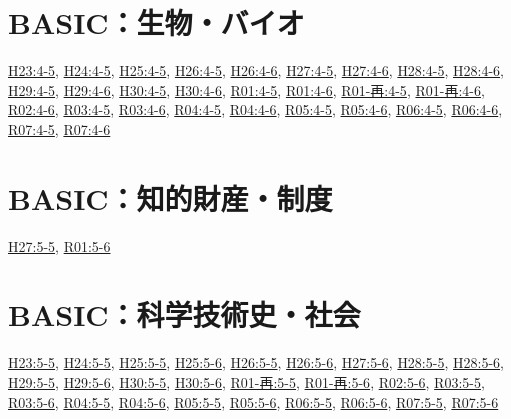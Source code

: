 \section{BASIC：生物・バイオ}
\hyperref[q:h23-reg-basic-4-5]{H23:4-5}, \hyperref[q:h24-reg-basic-4-5]{H24:4-5}, \hyperref[q:h25-reg-basic-4-5]{H25:4-5}, \hyperref[q:h26-reg-basic-4-5]{H26:4-5}, \hyperref[q:h26-reg-basic-4-6]{H26:4-6}, \hyperref[q:h27-reg-basic-4-5]{H27:4-5}, \hyperref[q:h27-reg-basic-4-6]{H27:4-6}, \hyperref[q:h28-reg-basic-4-5]{H28:4-5}, \hyperref[q:h28-reg-basic-4-6]{H28:4-6}, \hyperref[q:h29-reg-basic-4-5]{H29:4-5}, \hyperref[q:h29-reg-basic-4-6]{H29:4-6}, \hyperref[q:h30-reg-basic-4-5]{H30:4-5}, \hyperref[q:h30-reg-basic-4-6]{H30:4-6}, \hyperref[q:r01-reg-basic-4-5]{R01:4-5}, \hyperref[q:r01-reg-basic-4-6]{R01:4-6}, \hyperref[q:r01-ret-basic-4-5]{R01-再:4-5}, \hyperref[q:r01-ret-basic-4-6]{R01-再:4-6}, \hyperref[q:r02-reg-basic-4-6]{R02:4-6}, \hyperref[q:r03-reg-basic-4-5]{R03:4-5}, \hyperref[q:r03-reg-basic-4-6]{R03:4-6}, \hyperref[q:r04-reg-basic-4-5]{R04:4-5}, \hyperref[q:r04-reg-basic-4-6]{R04:4-6}, \hyperref[q:r05-reg-basic-4-5]{R05:4-5}, \hyperref[q:r05-reg-basic-4-6]{R05:4-6}, \hyperref[q:r06-reg-basic-4-5]{R06:4-5}, \hyperref[q:r06-reg-basic-4-6]{R06:4-6}, \hyperref[q:r07-reg-basic-4-5]{R07:4-5}, \hyperref[q:r07-reg-basic-4-6]{R07:4-6}
\section{BASIC：知的財産・制度}
\hyperref[q:h27-reg-basic-5-5]{H27:5-5}, \hyperref[q:r01-reg-basic-5-6]{R01:5-6}
\section{BASIC：科学技術史・社会}
\hyperref[q:h23-reg-basic-5-5]{H23:5-5}, \hyperref[q:h24-reg-basic-5-5]{H24:5-5}, \hyperref[q:h25-reg-basic-5-5]{H25:5-5}, \hyperref[q:h25-reg-basic-5-6]{H25:5-6}, \hyperref[q:h26-reg-basic-5-5]{H26:5-5}, \hyperref[q:h26-reg-basic-5-6]{H26:5-6}, \hyperref[q:h27-reg-basic-5-6]{H27:5-6}, \hyperref[q:h28-reg-basic-5-5]{H28:5-5}, \hyperref[q:h28-reg-basic-5-6]{H28:5-6}, \hyperref[q:h29-reg-basic-5-5]{H29:5-5}, \hyperref[q:h29-reg-basic-5-6]{H29:5-6}, \hyperref[q:h30-reg-basic-5-5]{H30:5-5}, \hyperref[q:h30-reg-basic-5-6]{H30:5-6}, \hyperref[q:r01-ret-basic-5-5]{R01-再:5-5}, \hyperref[q:r01-ret-basic-5-6]{R01-再:5-6}, \hyperref[q:r02-reg-basic-5-6]{R02:5-6}, \hyperref[q:r03-reg-basic-5-5]{R03:5-5}, \hyperref[q:r03-reg-basic-5-6]{R03:5-6}, \hyperref[q:r04-reg-basic-5-5]{R04:5-5}, \hyperref[q:r04-reg-basic-5-6]{R04:5-6}, \hyperref[q:r05-reg-basic-5-5]{R05:5-5}, \hyperref[q:r05-reg-basic-5-6]{R05:5-6}, \hyperref[q:r06-reg-basic-5-5]{R06:5-5}, \hyperref[q:r06-reg-basic-5-6]{R06:5-6}, \hyperref[q:r07-reg-basic-5-5]{R07:5-5}, \hyperref[q:r07-reg-basic-5-6]{R07:5-6}
